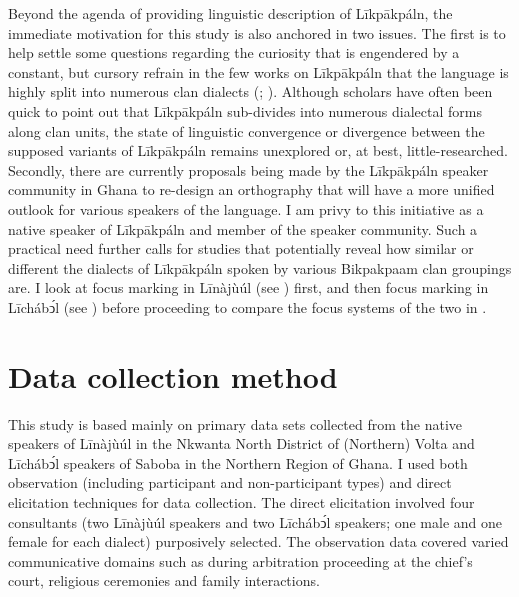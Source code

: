 \documentclass[output=paper,colorlinks,citecolor=brown]{langscibook}
\begin{document}
Beyond the agenda of providing linguistic description of Līkpākpáln, the immediate motivation for this study is also anchored in two issues. The first is to help settle some questions regarding the curiosity that is engendered by a constant, but cursory refrain in the few works on Līkpākpáln that the language is highly split into numerous clan dialects (\citealt[182]{Schwarz2009}; \citealt[107]{Hasselbring2006}). Although scholars have often been quick to point out that Līkpākpáln sub-divides into numerous dialectal forms along clan units, the state of linguistic convergence or divergence between the supposed variants of Līkpākpáln remains unexplored or, at best, little-researched. Secondly, there are currently proposals being made by the Līkpākpáln speaker community in Ghana to re-design an orthography that will have a more unified outlook for various speakers of the language. I am privy to this initiative as a native speaker of Līkpākpáln and member of the speaker community. Such a practical need further calls for studies that potentially reveal how similar or different the dialects of Līkpākpáln spoken by various Bikpakpaam clan groupings are. I look at focus marking in Līnàjùúl (see ) first, and then focus marking in Līchábͻ́l (see ) before proceeding to compare the focus systems of the two in .

\section{Data collection method}\label{sec:bisilki:4}

This study is based mainly on primary data sets collected from the native speakers of Līnàjùúl in the Nkwanta North District of (Northern) Volta and Līchábͻ́l speakers of Saboba in the Northern Region of Ghana. I used both observation (including participant and non-participant types) and direct elicitation techniques for data collection. The direct elicitation involved four consultants (two Līnàjùúl speakers and two Līchábͻ́l speakers; one male and one female for each dialect) purposively selected. The observation data covered varied communicative domains such as during arbitration proceeding at the chief’s court, religious ceremonies and family interactions.
\end{document}
